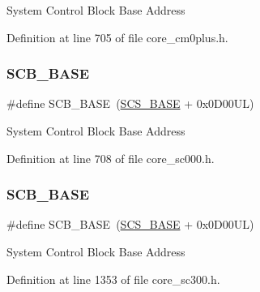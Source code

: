 System Control Block Base Address 

Definition at line 705 of file core\+\_\+cm0plus.\+h.

\mbox{\label{group___c_m_s_i_s__core__base_gad55a7ddb8d4b2398b0c1cfec76c0d9fd}} 
\subsubsection{\texorpdfstring{S\+C\+B\+\_\+\+B\+A\+SE}{SCB\_BASE}\hspace{0.1cm}{\footnotesize\ttfamily [3/7]}}
{\footnotesize\ttfamily \#define S\+C\+B\+\_\+\+B\+A\+SE~(\hyperlink{group___c_m_s_i_s__core__base_ga3c14ed93192c8d9143322bbf77ebf770}{S\+C\+S\+\_\+\+B\+A\+SE} +  0x0\+D00\+U\+L)}

System Control Block Base Address 

Definition at line 708 of file core\+\_\+sc000.\+h.

\mbox{\label{group___c_m_s_i_s__core__base_gad55a7ddb8d4b2398b0c1cfec76c0d9fd}} 
\subsubsection{\texorpdfstring{S\+C\+B\+\_\+\+B\+A\+SE}{SCB\_BASE}\hspace{0.1cm}{\footnotesize\ttfamily [4/7]}}
{\footnotesize\ttfamily \#define S\+C\+B\+\_\+\+B\+A\+SE~(\hyperlink{group___c_m_s_i_s__core__base_ga3c14ed93192c8d9143322bbf77ebf770}{S\+C\+S\+\_\+\+B\+A\+SE} +  0x0\+D00\+U\+L)}

System Control Block Base Address 

Definition at line 1353 of file core\+\_\+sc300.\+h.

\mbox{\label{group___c_m_s_i_s__core__base_gad55a7ddb8d4b2398b0c1cfec76c0d9fd}} 
